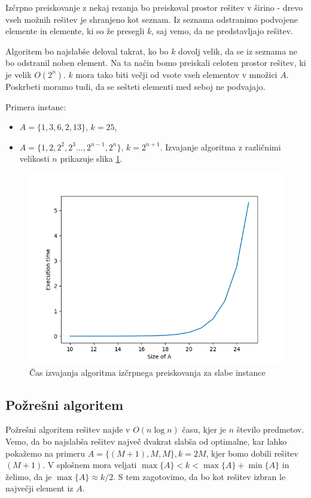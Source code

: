 \documentclass{article}
\begin{document}
Izčrpno preiskovanje z nekaj rezanja bo preiskoval prostor rešitev v širino -
drevo vseh možnih rešitev je shranjeno kot seznam. Iz seznama odstranimo
podvojene elemente in elemente, ki so že presegli $k$, saj vemo, da ne
predstavljajo rešitev.

Algoritem bo najslabše deloval takrat, ko bo $k$ dovolj velik, da se iz seznama
ne bo odstranil noben element. Na ta način bomo preiskali celoten prostor
rešitev, ki je velik $O(2^n)$. $k$ mora tako biti večji od vsote vseh elementov
v množici $A$. Poskrbeti moramo tudi, da se sešteti elementi med seboj ne
podvajajo.

Primera instanc:
\begin{itemize}
	\item $A = \{ 1, 3, 6, 2, 13 \}$, $k = 25$,
	\item $A = \{ 1, 2, 2^2, 2^3 ..., 2^{n-1}, 2^n \}$, $k = 2^{n+1}$. Izvajanje
	algoritma z različnimi velikosti $n$ prikazuje slika \ref{fig:exh}.
\end{itemize}

\begin{figure}
	\centering
	\includegraphics[width=0.8\linewidth]{figs/exh-hard.png}
	\caption{Čas izvajanja algoritma izčrpnega preiskovanja za slabe instance}
	\label{fig:exh}
\end{figure}

\subsection{Požrešni algoritem}

Požrešni algoritem rešitev najde v $O(n \log n)$ času, kjer je $n$ število
predmetov. Vemo, da bo najslabša rešitev največ dvakrat slabša od optimalne, kar
lahko pokažemo na primeru $A = \{(M + 1), M, M \}, k = 2M$, kjer bomo dobili
rešitev $(M+1)$. V splošnem mora veljati $\max\{A\} < k < \max\{A\} + \min\{A\}$
in želimo, da je $\max\{A\} \approx k/2$. S tem zagotovimo, da bo kot rešitev
izbran le največji element iz $A$.
\end{document}
